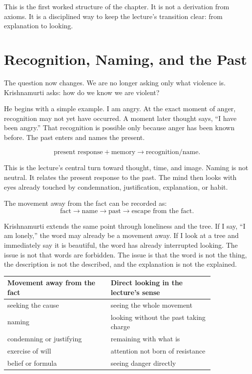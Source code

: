 This is the first worked structure of the chapter. It is not a derivation from axioms. It is a disciplined way to keep the lecture's transition clear: from explanation to looking.

\section{Recognition, Naming, and the Past}

The question now changes. We are no longer asking only what violence is. Krishnamurti asks: how do we know we are violent?

He begins with a simple example. I am angry. At the exact moment of anger, recognition may not yet have occurred. A moment later thought says, ``I have been angry.'' That recognition is possible only because anger has been known before. The past enters and names the present.

\begin{equation}
\text{present response}+\text{memory}
\rightarrow
\text{recognition/name}.
\end{equation}

This is the lecture's central turn toward thought, time, and image. Naming is not neutral. It relates the present response to the past. The mind then looks with eyes already touched by condemnation, justification, explanation, or habit.

The movement away from the fact can be recorded as:
\begin{equation}
\text{fact}
\rightarrow
\text{name}
\rightarrow
\text{past}
\rightarrow
\text{escape from the fact}.
\end{equation}

Krishnamurti extends the same point through loneliness and the tree. If I say, ``I am lonely,'' the word may already be a movement away. If I look at a tree and immediately say it is beautiful, the word has already interrupted looking. The issue is not that words are forbidden. The issue is that the word is not the thing, the description is not the described, and the explanation is not the explained.

\begin{table}
\centering
\begin{tabular}{p{0.42\linewidth}p{0.42\linewidth}}
Movement away from the fact & Direct looking in the lecture's sense \\
\hline
seeking the cause & seeing the whole movement \\
naming & looking without the past taking charge \\
condemning or justifying & remaining with what is \\
exercise of will & attention not born of resistance \\
belief or formula & seeing danger directly \\
\end{tabular}
\end{table}

